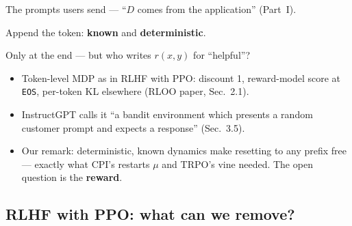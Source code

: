 \begin{pair}[3]
\begin{slatebox}[title={Start distribution $D$}]
\small The prompts users send --- ``$D$ comes from the application'' (Part~I).
\end{slatebox}
\begin{coolbox}[title={Dynamics}]
\small Append the token: \textbf{known} and \textbf{deterministic}.
\end{coolbox}
\begin{warmbox}[title={Reward}]
\small Only at the end --- but who writes $r(x,y)$ for ``helpful''?
\end{warmbox}
\end{pair}

\begin{notebox}
\begin{itemize}[leftmargin=*]
  \item Token-level MDP as in RLHF with PPO: discount 1, reward-model score at \texttt{EOS}, per-token KL elsewhere (RLOO paper, Sec.~2.1).
  \item InstructGPT calls it ``a bandit environment which presents a random customer prompt and expects a response'' (Sec.~3.5).
  \item Our remark: deterministic, known dynamics make resetting to any prefix free --- exactly what CPI's restarts $\mu$ and TRPO's vine needed. The open question is the \textbf{reward}.
\end{itemize}
\end{notebox}

\subsection{RLHF with PPO: what can we remove?}


